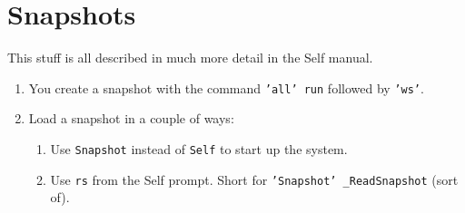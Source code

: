 \section{Snapshots}
This stuff is all described in much more detail in the Self manual.

\begin{enumerate}

\item You create a snapshot with the command {\tt 'all' run} followed
by {\tt 'ws'}.

\item
Load a snapshot in a couple of ways:

\begin{enumerate}

\item Use {\tt Snapshot} instead of {\tt Self} to start up the system.

\item Use {\tt rs} from the Self prompt.  Short for {\tt 'Snapshot'
\_ReadSnapshot} (sort of).

\end{enumerate}

\end{enumerate}

